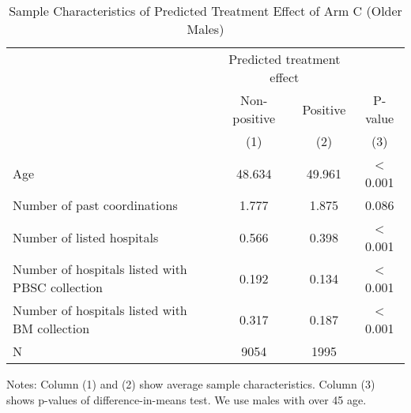 \documentclass[
  lualatex,
  11pt,
  a4paper
]{article}
\begin{document}
\begin{table}[H]

\caption{\label{tab:rcf-older-male}Sample Characteristics of Predicted Treatment Effect of Arm C (Older Males)}
\centering
\fontsize{9}{11}\selectfont
\fontsize{9}{11}\selectfont
\begin{threeparttable}
\begin{tabular}[t]{lccc}
\toprule
\multicolumn{1}{c}{ } & \multicolumn{2}{c}{Predicted treatment effect} & \multicolumn{1}{c}{ } \\
\cmidrule(l{3pt}r{3pt}){2-3}
\multicolumn{1}{c}{ } & \multicolumn{1}{c}{Non-positive} & \multicolumn{1}{c}{Positive} & \multicolumn{1}{c}{P-value} \\
\cmidrule(l{3pt}r{3pt}){2-2} \cmidrule(l{3pt}r{3pt}){3-3} \cmidrule(l{3pt}r{3pt}){4-4}
 & (1) & (2) & (3)\\
\midrule
Age & 48.634 & 49.961 & < 0.001\\
Number of past coordinations & 1.777 & 1.875 & 0.086\\
Number of listed hospitals & 0.566 & 0.398 & < 0.001\\
Number of hospitals listed with PBSC collection & 0.192 & 0.134 & < 0.001\\
Number of hospitals listed with BM collection & 0.317 & 0.187 & < 0.001\\
N & 9054 & 1995 & \\
\bottomrule
\end{tabular}
\begin{tablenotes}
\item Notes: Column (1) and (2) show average sample characteristics. Column (3) shows p-values of difference-in-means test. We use males with over 45 age.
\end{tablenotes}
\end{threeparttable}
\end{table}
\end{document}

